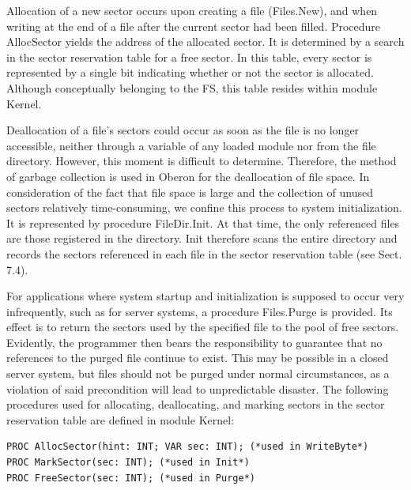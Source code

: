 Allocation of a new sector occurs upon creating a file (Files.New), and when writing at the end of
a file after the current sector had been filled. Procedure AllocSector yields the address of the
allocated sector. It is determined by a search in the sector reservation table for a free sector. In
this table, every sector is represented by a single bit indicating whether or not the sector is
allocated. Although conceptually belonging to the FS, this table resides within module
Kernel.

Deallocation of a file's sectors could occur as soon as the file is no longer accessible, neither
through a variable of any loaded module nor from the file directory. However, this moment is
difficult to determine. Therefore, the method of garbage collection is used in Oberon for the
deallocation of file space. In consideration of the fact that file space is large and the collection of
unused sectors relatively time-consuming, we confine this process to system initialization. It is
represented by procedure FileDir.Init. At that time, the only referenced files are those registered
in the directory. Init therefore scans the entire directory and records the sectors referenced in
each file in the sector reservation table (see Sect. 7.4).

For applications where system startup and initialization is supposed to occur very infrequently,
such as for server systems, a procedure Files.Purge is provided. Its effect is to return the sectors
used by the specified file to the pool of free sectors. Evidently, the programmer then bears the
responsibility to guarantee that no references to the purged file continue to exist. This may be
possible in a closed server system, but files should not be purged under normal circumstances,
as a violation of said precondition will lead to unpredictable disaster.
The following procedures used for allocating, deallocating, and marking sectors in the sector
reservation table are defined in module Kernel:
\begin{verbatim}
PROC AllocSector(hint: INT; VAR sec: INT); (*used in WriteByte*)
PROC MarkSector(sec: INT); (*used in Init*)
PROC FreeSector(sec: INT); (*used in Purge*)
\end{verbatim}

